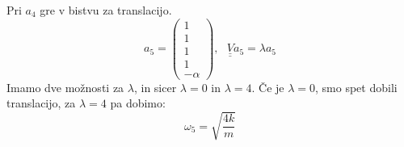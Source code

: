 \documentclass[a4paper]{article}
\newcommand{\duline}[1]{\underline{\underline{#1}}}
\begin{document}
Pri $a_4$ gre v bistvu za translacijo.
$$a_5 = \begin{pmatrix}
    1 \\ 1 \\ 1 \\ 1 \\ -\alpha
\end{pmatrix},~~~\duline{V}a_5 = \lambda a_5$$
Imamo dve možnosti za $\lambda$, in sicer $\lambda = 0$ in $\lambda = 4$. Če je $\lambda = 0$, smo spet dobili translacijo, za $\lambda = 4$ pa dobimo:
$$\omega_5 = \sqrt{\frac{4k}{m}}$$
\end{document}
